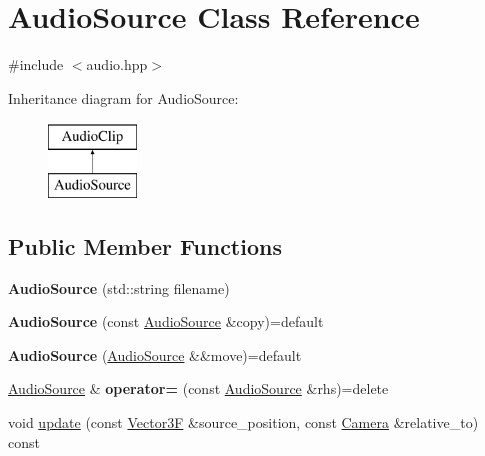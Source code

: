 \hypertarget{class_audio_source}{}\section{Audio\+Source Class Reference}
\label{class_audio_source}


{\ttfamily \#include $<$audio.\+hpp$>$}

Inheritance diagram for Audio\+Source\+:\begin{figure}[H]
\begin{center}
\leavevmode
\includegraphics[height=2.000000cm]{class_audio_source}
\end{center}
\end{figure}
\subsection*{Public Member Functions}
\begin{DoxyCompactItemize}
\item 
\mbox{\label{class_audio_source_a0cb3b38b2e113d9b8b86b4d9fd8046d8}} 
{\bfseries Audio\+Source} (std\+::string filename)
\item 
\mbox{\label{class_audio_source_a238c56998543c1bbe08d67467957e050}} 
{\bfseries Audio\+Source} (const \mbox{\hyperlink{class_audio_source}{Audio\+Source}} \&copy)=default
\item 
\mbox{\label{class_audio_source_a9ff96d14841ecd4aef40918cf8348464}} 
{\bfseries Audio\+Source} (\mbox{\hyperlink{class_audio_source}{Audio\+Source}} \&\&move)=default
\item 
\mbox{\label{class_audio_source_aa73e35b3259f93e55a897b4c42e198d8}} 
\mbox{\hyperlink{class_audio_source}{Audio\+Source}} \& {\bfseries operator=} (const \mbox{\hyperlink{class_audio_source}{Audio\+Source}} \&rhs)=delete
\item 
void \mbox{\hyperlink{class_audio_source_acc045186f5f7516c3b71598f0b65b0c5}{update}} (const \mbox{\hyperlink{class_vector3}{Vector3F}} \&source\+\_\+position, const \mbox{\hyperlink{class_camera}{Camera}} \&relative\+\_\+to) const
\end{DoxyCompactItemize}


